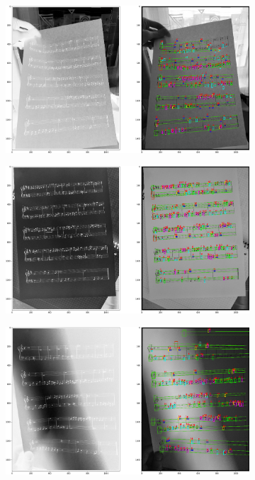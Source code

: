 \documentclass[12pt]{article}
\begin{document}
\begin{enumerate}
\begin{figure}
\begin{subfigure}[b]{0.48\linewidth}
				\end{subfigure}
				\begin{subfigure}[b]{0.48\linewidth}
					\includegraphics[width=\linewidth]{Hard/Zdj23.png}
				\end{subfigure}
				\begin{subfigure}[b]{0.48\linewidth}
					\includegraphics[width=\linewidth]{Hard/Zdj24.png}
				\end{subfigure}
				\begin{subfigure}[b]{0.48\linewidth}
					\includegraphics[width=\linewidth]{Hard/Zdj25.png}

\end{subfigure}
\end{figure}
\end{enumerate}
\end{document}
